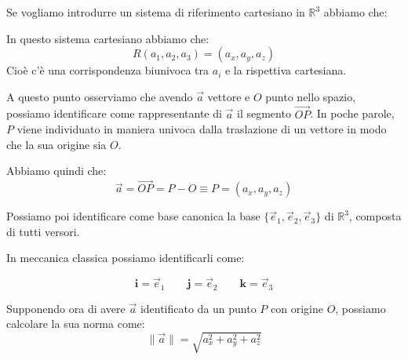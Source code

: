 \documentclass[11pt,a4paper,twoside]{article}
\theoremstyle{definition}
\begin{document}
Se vogliamo introdurre un sistema di riferimento cartesiano in $\mathbb R^3$ abbiamo che:

\begin{center}
\end{center}

In questo sistema cartesiano abbiamo che:
\[
	R(a_1,a_2,a_3) = (a_x, a_y, a_z)
\]
Cioè c'è una corrispondenza biunivoca tra $a_i$ e la rispettiva cartesiana.

A questo punto osserviamo che avendo $\vec a$ vettore e $O$ punto nello spazio, possiamo identificare come rappresentante di $\vec a$ il segmento $\vec{OP}$. In poche parole, $P$ viene individuato in maniera univoca dalla traslazione di un vettore in modo che la sua origine sia $O$.

Abbiamo quindi che:
\[
	\vec a = \vec {OP} = P-O \equiv P = (a_x, a_y, a_z)
\]

Possiamo poi identificare come base canonica la base $\{\vec e_1, \vec e_2, \vec e_3\}$ di $\mathbb R^3$, composta di tutti versori.

In meccanica classica possiamo identificarli come:

\[
	\mathbf{i} = \vec e_1 \qquad \mathbf{j} = \vec e_2 \qquad \mathbf{k} = \vec e_3
\]

Supponendo ora di avere $\vec a$ identificato da un punto $P$ con origine $O$, possiamo calcolare la sua norma come:
\[ \| \vec a\| = \sqrt{a_x^2 + a_y^2 + a_z^2}\]

\begin{center}
\end{center}
\end{document}
